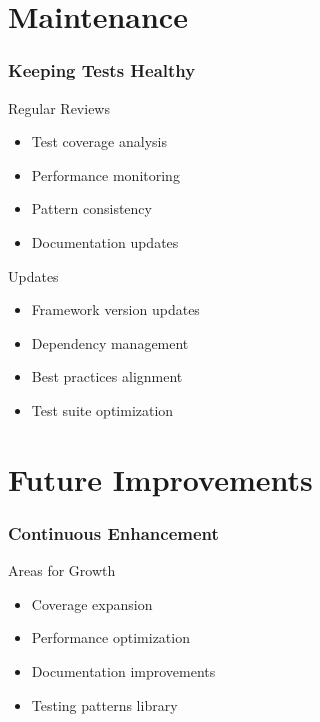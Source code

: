 \documentclass{beamer}
\begin{document}
\section{Maintenance}
\begin{frame}
    \frametitle{Keeping Tests Healthy}
    \begin{block}{Regular Reviews}
        \begin{itemize}
            \item Test coverage analysis
            \item Performance monitoring
            \item Pattern consistency
            \item Documentation updates
        \end{itemize}
    \end{block}
    
    \begin{block}{Updates}
        \begin{itemize}
            \item Framework version updates
            \item Dependency management
            \item Best practices alignment
            \item Test suite optimization
        \end{itemize}
    \end{block}
\end{frame}

\section{Future Improvements}
\begin{frame}
    \frametitle{Continuous Enhancement}
    \begin{exampleblock}{Areas for Growth}
        \begin{itemize}
            \item Coverage expansion \pause
            \item Performance optimization \pause
            \item Documentation improvements \pause
            \item Testing patterns library
        \end{itemize}
    \end{exampleblock}
\end{frame}
\end{document}
